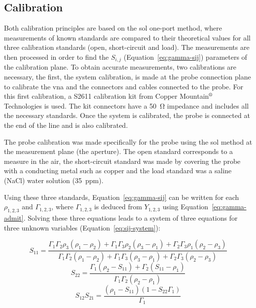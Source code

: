\subsection{Calibration}\label{subsec:metho-calib}
Both calibration principles are based on the \ac{sol} one-port method, where measurements of known standards are compared to their theoretical values for all three calibration standards (open, short-circuit and load).
The measurements are then processed in order to find the \(S_{i,j}\) (Equation~\ref{eq:gamma-sij}) parameters of the calibration plane.
To obtain accurate measurements, two calibrations are necessary, the first, the system calibration, is made at the probe connection plane to calibrate the \ac{vna} and the connectors and cables connected to the probe.
For this first calibration, a S2611 calibration kit from Copper Mountain\(^\text{\textregistered}\) Technologies is used.
The kit connectors have a \SI{50}{\ohm} impedance and includes all the necessary standards.
Once the system is calibrated, the probe is connected at the end of the line and is also calibrated.

The probe calibration was made specifically for the probe using the \ac{sol} method at the measurement plane (the aperture).
The open standard corresponds to a measure in the air, the short-circuit standard was made by covering the probe with a conducting metal such as copper and the load standard was a saline (NaCl) water solution (\qty{35}{ppm}).

Using these three standards, Equation~\ref{eq:gamma-sij} can be written for each \(\rho_{1,2,3}\) and \(\Gamma_{1,2,3}\), where \(\Gamma_{1,2,3}\) is deduced from \(Y_{1,2,3}\) using Equation~\ref{eq:gamma-admit}.
Solving these three equations leads to a system of three equations for three unknown variables (Equation~\ref{eq:sij-system}):

{\footnotesize
\begin{equation*}
    S_{11} = \frac{\Gamma_1\Gamma_2\rho_3(\rho_1-\rho_2) + 
                   \Gamma_1\Gamma_3\rho_2(\rho_3-\rho_1) + 
                   \Gamma_2\Gamma_3\rho_1(\rho_2-\rho_3)}
                  {\Gamma_1\Gamma_2(\rho_1-\rho_2) + 
                   \Gamma_1\Gamma_3(\rho_3-\rho_1) +
                   \Gamma_2\Gamma_3(\rho_2-\rho_3)}
\end{equation*}
%
\begin{equation}\label{eq:sij-system}
    S_{22} = \frac{\Gamma_1(\rho_2-S_{11}) + \Gamma_2(S_{11}-\rho_1)}       
                  {\Gamma_1\Gamma_2(\rho_2-\rho_1)}
\end{equation}
%
\begin{equation*}
    S_{12}S_{21} = \frac{(\rho_1-S_{11})(1-S_{22}\Gamma_1)}{\Gamma_1}
\end{equation*}}%

